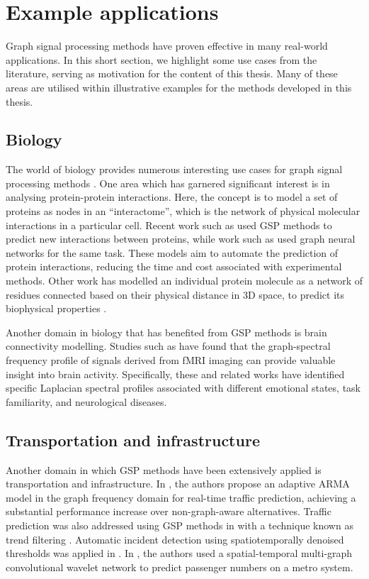 \newpage

\section{Example applications}

Graph signal processing methods have proven effective in many real-world applications. In this short section, we highlight some use cases from the literature, serving as motivation for the content of this thesis. Many of these areas are utilised within illustrative examples for the methods developed in this thesis. 

\subsection{Biology}

The world of biology provides numerous interesting use cases for graph signal processing methods \citep{Li2023}. One area which has garnered significant interest is in analysing protein-protein interactions. Here, the concept is to model a set of proteins as nodes in an ``interactome'', which is the network of physical molecular interactions in a particular cell. Recent work such as \cite{Colonnese2021} used GSP methods to predict new interactions between proteins, while work such as \cite{Jha2022} used graph neural networks for the same task. These models aim to automate the prediction of protein interactions, reducing the time and cost associated with experimental methods. Other work has modelled an individual protein molecule as a network of residues connected based on their physical distance in 3D space, to predict its biophysical properties \citep{Srivastava2023}. 

Another domain in biology that has benefited from GSP methods is brain connectivity modelling. Studies such as \cite{Goldsberry2017, Atasoy2016, Menoret2017, Itani2021} have found that the graph-spectral frequency profile of signals derived from fMRI imaging can provide valuable insight into brain activity. Specifically, these and related works have identified specific Laplacian spectral profiles associated with different emotional states, task familiarity, and neurological diseases.

\subsection{Transportation and infrastructure}

Another domain in which GSP methods have been extensively applied is transportation and infrastructure. In \cite{Hasanzadeh2017}, the authors propose an adaptive ARMA model in the graph frequency domain for real-time traffic prediction, achieving a substantial performance increase over non-graph-aware alternatives. Traffic prediction was also addressed using GSP methods in \cite{Chakraborty2017} with a technique known as trend filtering \citep{Wang2016}. Automatic incident detection using spatiotemporally denoised thresholds was applied in \citep{Chakraborty2019}. In \cite{Xiu2022}, the authors used a spatial-temporal multi-graph convolutional wavelet network to predict passenger numbers on a metro system.

